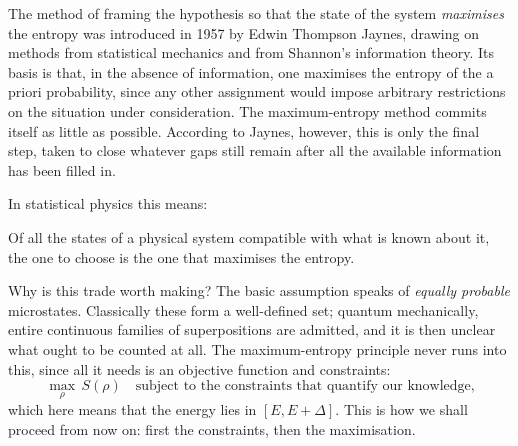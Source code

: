 The method of framing the hypothesis so that the state of the system \emph{maximises} the entropy was introduced in 1957 by Edwin Thompson Jaynes, drawing on methods from statistical mechanics and from Shannon's information theory. Its basis is that, in the absence of information, one maximises the entropy of the a priori probability, since any other assignment would impose arbitrary restrictions on the situation under consideration. The maximum-entropy method commits itself as little as possible. According to Jaynes, however, this is only the final step, taken to close whatever gaps still remain after all the available information has been filled in.

In statistical physics this means: 
\begin{center}
\parbox[c][5cm][c]{14cm}{\begin{tcolorbox}[colback=banana,arc=0cm,frame hidden,enhanced]{Of all the states of a physical system compatible with what is known about it, the one to choose is the one that maximises the entropy.}\end{tcolorbox}}
\end{center}

Why is this trade worth making? The basic assumption speaks of \emph{equally probable} microstates. Classically these form a well-defined set; quantum mechanically, entire continuous families of superpositions are admitted, and it is then unclear what ought to be counted at all. The maximum-entropy principle never runs into this, since all it needs is an objective function and constraints:
\begin{equation}
  \max_{\rho}\, S(\rho) \quad \text{subject to the constraints that quantify our knowledge,}
\end{equation}
which here means that the energy lies in $[E,E+\Delta]$. This is how we shall proceed from now on: first the constraints, then the maximisation.
